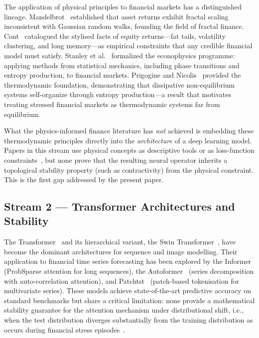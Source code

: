 \documentclass[11pt,a4paper]{article}  %
\theoremstyle{plain}
\theoremstyle{definition}
\theoremstyle{remark}
\begin{document}
The application of physical principles to financial markets
has a distinguished lineage. Mandelbrot~\cite{Mandelbrot1963}
established that asset returns exhibit fractal scaling inconsistent
with Gaussian random walks, founding the field of fractal finance.
Cont~\cite{Cont2001} catalogued the stylised facts of equity
returns---fat tails, volatility clustering, and long memory---as
empirical constraints that any credible financial model must satisfy.
Stanley et al.~\cite{Stanley1999} formalized the econophysics programme:
applying methods from statistical mechanics, including phase
transitions and entropy production, to financial markets.
Prigogine and Nicolis~\cite{Prigogine1977} provided the thermodynamic
foundation, demonstrating that dissipative non-equilibrium systems
self-organize through entropy production---a result that motivates
treating stressed financial markets as thermodynamic systems
far from equilibrium.

What the physics-informed finance literature has \emph{not}
achieved is embedding these thermodynamic principles directly
into the \emph{architecture} of a deep learning model. Papers in
this stream use physical concepts as descriptive tools or as
loss-function constraints~\cite{Raissi2019}, but none prove that
the resulting neural operator inherits a topological stability
property (such as contractivity) from the physical constraint.
This is the first gap addressed by the present paper.

\subsection{Stream 2 — Transformer Architectures and Stability}
\label{subsec:stream2}

The Transformer~\cite{Vaswani2017} and its hierarchical variant,
the Swin Transformer~\cite{Liu2021}, have become the dominant
architectures for sequence and image modelling. Their application
to financial time series forecasting has been explored by the
Informer~\cite{Zhou2021} (ProbSparse attention for long sequences),
the Autoformer~\cite{Wu2021} (series decomposition with
auto-correlation attention), and Patchtst~\cite{Nie2023} (patch-based
tokenisation for multivariate series). These models achieve
state-of-the-art predictive accuracy on standard benchmarks but
share a critical limitation: none provide a mathematical stability
guarantee for the attention mechanism under distributional shift,
i.e., when the test distribution diverges substantially from the
training distribution as occurs during financial stress
episodes~\cite{Dehghani2023}.
\end{document}
